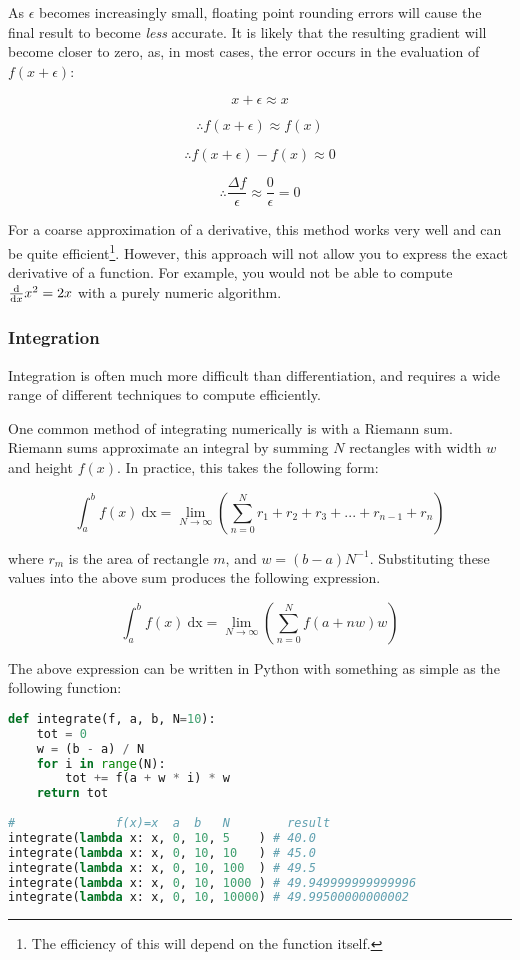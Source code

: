 \documentclass[12pt]{article}
\begin{document}
As $\epsilon$ becomes increasingly small, floating point rounding errors will cause the final result to become \textit{less} accurate. It is likely that the resulting gradient will become closer to zero, as, in most cases, the error occurs in the evaluation of $f(x+\epsilon)$:

$$
x+\epsilon \approx x
$$

$$
\therefore f(x+\epsilon) \approx f(x)
$$

$$
\therefore f(x+\epsilon) - f(x) \approx 0
$$

$$
\therefore \frac{\Delta f}{\epsilon} \approx \frac{0}{\epsilon} = 0
$$

For a coarse approximation of a derivative, this method works very well and can be quite efficient\footnote{The efficiency of this will depend on the function itself.}. However, this approach will not allow you to express the exact derivative of a function. For example, you would not be able to compute $\dv{x}x^2=2x$ with a purely numeric algorithm.

\subsubsection{Integration}

Integration is often much more difficult than differentiation, and requires a wide range of different techniques to compute efficiently.

One common method of integrating numerically is with a Riemann sum\cite{riemannsum}. Riemann sums approximate an integral by summing $N$ rectangles with width $w$ and height $f(x)$. In practice, this takes the following form:

$$
\int_{a}^{b}{f(x) \ \text{dx}} = \lim_{N \rightarrow \infty}\left(\sum_{n=0}^{N}{r_1+r_2+r_3+...+r_{n-1}+r_{n}} \right)
$$

\noindent
where $r_m$ is the area of rectangle $m$, and $w=(b-a)N^{-1}$. Substituting these values into the above sum produces the following expression.

$$
\int_{a}^{b}{f(x) \ \text{dx}} = \lim_{N \rightarrow \infty} \left( \sum_{n=0}^{N}{f \left( a+nw \right) w } \right)
$$

The above expression can be written in Python with something as simple as the following function:

\begin{lstlisting}[language=python]
def integrate(f, a, b, N=10):
	tot = 0
	w = (b - a) / N
	for i in range(N):
		tot += f(a + w * i) * w
	return tot
	
#              f(x)=x  a  b   N        result
integrate(lambda x: x, 0, 10, 5    ) # 40.0
integrate(lambda x: x, 0, 10, 10   ) # 45.0
integrate(lambda x: x, 0, 10, 100  ) # 49.5
integrate(lambda x: x, 0, 10, 1000 ) # 49.949999999999996
integrate(lambda x: x, 0, 10, 10000) # 49.99500000000002
\end{lstlisting}
\end{document}
